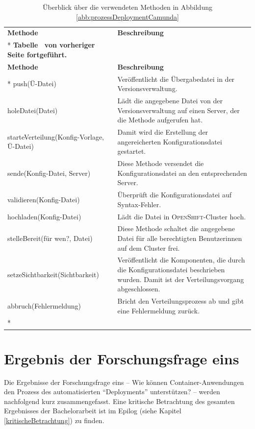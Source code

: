 \begin{longtable}{@{}p{5.5cm}p{8.0cm}@{}}
	\toprule[1.5pt]
	\textbf{Methode} & \textbf{Beschreibung} \\* \midrule
	\endfirsthead
	\multicolumn{2}{c}%
	{{\bfseries Tabelle \thetable\ von vorheriger Seite fortgeführt.}} \\
	\toprule
	\textbf{Methode} & \textbf{Beschreibung} \\* \midrule
	\endhead
	\bottomrule
	\endfoot
	\endlastfoot
	push(Ü-Datei) & Veröffentlicht die Übergabedatei in der Versionsverwaltung. \\
	holeDatei(Datei) & Lädt die angegebene Datei von der Versionsverwaltung auf einen Server, der die Methode aufgerufen hat. \\
	starteVerteilung(Konfig-Vorlage, Ü-Datei) & Damit wird die Erstellung der angereicherten Konfigurationsdatei gestartet. \\
	sende(Konfig-Datei, Server) & Diese Methode versendet die Konfigurationsdatei an den entsprechenden Server. \\
	validieren(Konfig-Datei) & Überprüft die Konfigurationsdatei auf Syntax-Fehler. \\
	hochladen(Konfig-Datei) & Lädt die Datei in \textsc{OpenShift}-Cluster hoch.\\
	stelleBereit(für wen?, Datei) & Diese Methode schaltet die angegebene Datei für alle berechtigten Benutzerinnen auf dem Cluster frei.\\
	setzeSichtbarkeit(Sichtbarkeit) & Veröffentlicht die Komponenten, die durch die Konfigurationsdatei beschrieben wurden. Damit ist der Verteilungsvorgang abgeschlossen.\\
	abbruch(Fehlermeldung) & Bricht den Verteilungsprozess ab und gibt eine Fehlermeldung zurück.\\* \bottomrule
	
	\caption{Überblick über die verwendeten Methoden in Abbildung \vref{abb:prozessDeploymentCamunda}}\label{tab:methodenFunktion}\\
\end{longtable}
 
\section{Ergebnis der Forschungsfrage eins}
Die Ergebnisse der Forschungsfrage eins -- Wie können Container-Anwendungen den Prozess des automatisierten \enquote{Deployments} unterstützen? -- werden nachfolgend kurz zusammengefasst. Eine kritische Betrachtung des gesamten Ergebnisses der Bachelorarbeit ist im Epilog (siehe Kapitel \vref{kritischeBetrachtung}) zu finden.

